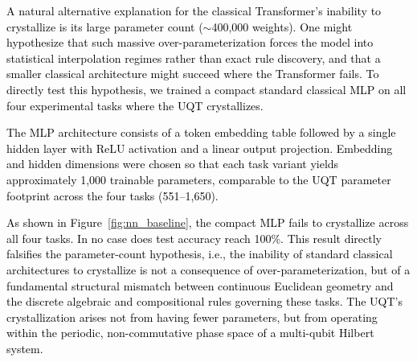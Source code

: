 \documentclass[11pt, a4paper]{article}
\begin{document}
\textcolor{black}{A natural alternative explanation for the classical Transformer's inability to crystallize is its large parameter count (${\sim}$400,000 weights). One might hypothesize that such massive over-parameterization forces the model into statistical interpolation regimes rather than exact rule discovery, and that a smaller classical architecture might succeed where the Transformer fails. To directly test this hypothesis, we trained a compact standard classical MLP on all four experimental tasks where the UQT crystallizes.}

\textcolor{black}{The MLP architecture consists of a token embedding table followed by a single hidden layer with ReLU activation and a linear output projection. Embedding and hidden dimensions were chosen so that each task variant yields approximately 1,000 trainable parameters, comparable to the UQT parameter footprint across the four tasks (551--1,650).}

\textcolor{black}{As shown in Figure~\ref{fig:nn_baseline}, the compact MLP fails to crystallize across all four tasks. In no case does test accuracy reach 100\%. This result directly falsifies the parameter-count hypothesis, i.e., the inability of standard classical architectures to crystallize is not a consequence of over-parameterization, but of a fundamental structural mismatch between continuous Euclidean geometry and the discrete algebraic and compositional rules governing these tasks. The UQT's crystallization arises not from having fewer parameters, but from operating within the periodic, non-commutative phase space of a multi-qubit Hilbert system.}
\end{document}
